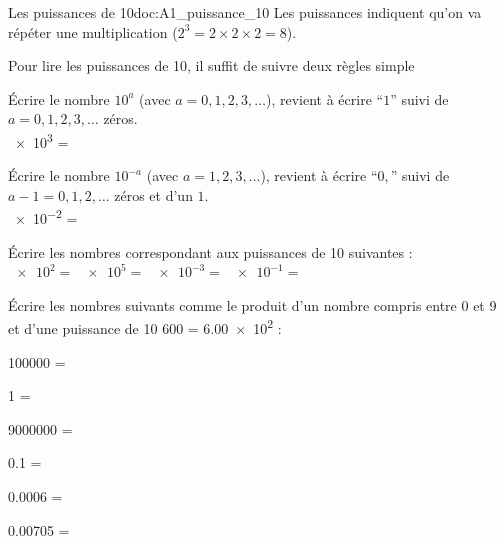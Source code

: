 \teteSndMeth

\vspace*{-36pt}


\vspace*{-20pt}

\begin{doc}{Les puissances de 10}{doc:A1_puissance_10}
  Les puissances indiquent qu'on va répéter une multiplication ($2^3 = 2 \times 2 \times 2 = 8$).
  
  Pour lire les puissances de 10, il suffit de suivre deux règles simple
  \begin{importants}
    \pointCyan Écrire le nombre $10^a$ (avec $a = 0, 1, 2, 3, \ldots$), revient à écrire ``$1$'' suivi de $a = 0, 1, 2, 3, \ldots$ zéros. \\
    \exemple \num{e3} = 

    \pointCyan Écrire le nombre $10^{-a}$ (avec $a = 1, 2, 3, \ldots$), revient à écrire ``$0,$'' suivi de $a - 1 = 0, 1, 2, \ldots$ zéros et d'un $1$. \\
    \exemple \num{e-2} = 
  \end{importants}
\end{doc}


\numeroQuestion Écrire les nombres correspondant aux puissances de 10 suivantes : \\
$\num{e2}  =$  \qq{}
$\num{e5}  =$  \qq{}
$\num{e-3} =$  \qq{}
$\num{e-1} =$ 

\numeroQuestion Écrire les nombres suivants comme le produit d'un nombre compris entre 0 et 9 et d'une puissance de 10 \exemple \num{600} = \num{6,00e2} :
\pasCorrection{\vspace*{-4pt}}
\begin{listePoints}[2]
  \setlength\itemsep{-4pt}
  \item \num{100000}  = 
  \item \num{1}       = 
  \item \num{9000000} = 
  \item \num{0,1}     = 
  \item \num{0,0006}  = 
  \item \num{0,00705} = 
\end{listePoints}


